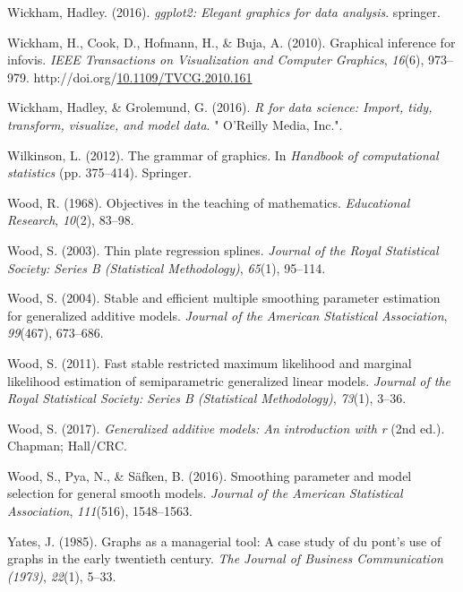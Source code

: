 \documentclass[print]{nuthesis}
\newlength{\cslhangindent}
\newenvironment{CSLReferences}%
{\setlength{\parindent}{0pt}%
\everypar{\setlength{\hangindent}{\cslhangindent}}\ignorespaces}%
{\par}
\begin{document}
\begin{CSLReferences}{1}{0}
\leavevmode{}%
Wickham, Hadley. (2016). \emph{ggplot2: Elegant graphics for data analysis}. springer.

\leavevmode{}%
Wickham, H., Cook, D., Hofmann, H., \& Buja, A. (2010). Graphical inference for infovis. \emph{IEEE Transactions on Visualization and Computer Graphics}, \emph{16}(6), 973--979. http://doi.org/\href{https://doi.org/10.1109/TVCG.2010.161}{10.1109/TVCG.2010.161}

\leavevmode{}%
Wickham, Hadley, \& Grolemund, G. (2016). \emph{R for data science: Import, tidy, transform, visualize, and model data}. " O'Reilly Media, Inc.".

\leavevmode{}%
Wilkinson, L. (2012). The grammar of graphics. In \emph{Handbook of computational statistics} (pp. 375--414). Springer.

\leavevmode{}%
Wood, R. (1968). Objectives in the teaching of mathematics. \emph{Educational Research}, \emph{10}(2), 83--98.

\leavevmode{}%
Wood, S. (2003). Thin plate regression splines. \emph{Journal of the Royal Statistical Society: Series B (Statistical Methodology)}, \emph{65}(1), 95--114.

\leavevmode{}%
Wood, S. (2004). Stable and efficient multiple smoothing parameter estimation for generalized additive models. \emph{Journal of the American Statistical Association}, \emph{99}(467), 673--686.

\leavevmode{}%
Wood, S. (2011). Fast stable restricted maximum likelihood and marginal likelihood estimation of semiparametric generalized linear models. \emph{Journal of the Royal Statistical Society: Series B (Statistical Methodology)}, \emph{73}(1), 3--36.

\leavevmode{}%
Wood, S. (2017). \emph{Generalized additive models: An introduction with r} (2nd ed.). Chapman; Hall/CRC.

\leavevmode{}%
Wood, S., Pya, N., \& Säfken, B. (2016). Smoothing parameter and model selection for general smooth models. \emph{Journal of the American Statistical Association}, \emph{111}(516), 1548--1563.

\leavevmode{}%
Yates, J. (1985). Graphs as a managerial tool: A case study of du pont's use of graphs in the early twentieth century. \emph{The Journal of Business Communication (1973)}, \emph{22}(1), 5--33.

\end{CSLReferences}
\end{document}
